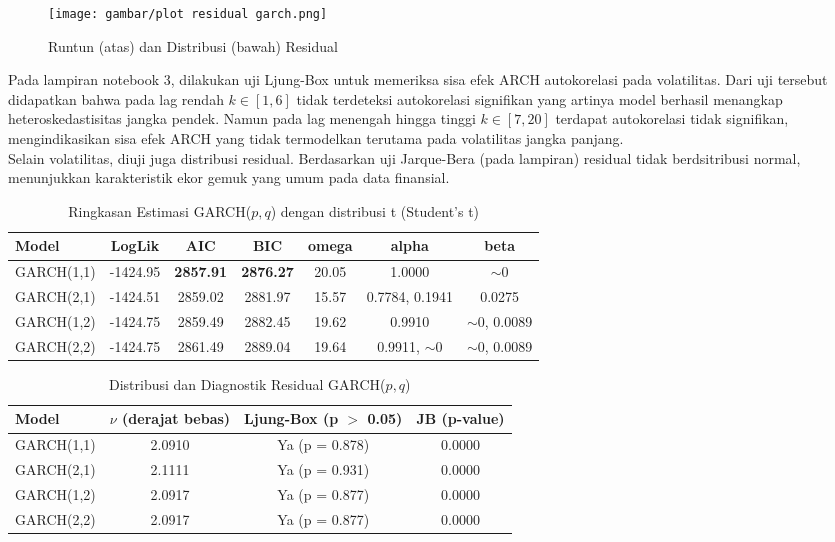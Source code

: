 \documentclass[a4paper,12pt]{article}
\begin{document}
\begin{figure}[htb!]
    \centering
    \texttt{[image: gambar/plot residual garch.png]}
    \caption{Runtun (atas) dan Distribusi (bawah) Residual}
    \label{fig:garchResid plot}
\end{figure}
Pada lampiran notebook 3, dilakukan uji Ljung-Box untuk memeriksa sisa efek ARCH autokorelasi pada volatilitas. Dari uji tersebut didapatkan bahwa pada lag rendah $k \in [1,6]$ tidak terdeteksi autokorelasi signifikan yang artinya model berhasil menangkap heteroskedastisitas jangka pendek. Namun pada lag menengah hingga tinggi $k \in [7, 20]$ terdapat autokorelasi tidak signifikan, mengindikasikan sisa efek ARCH yang tidak termodelkan terutama pada volatilitas jangka panjang. \\

Selain volatilitas, diuji juga distribusi residual. Berdasarkan uji Jarque-Bera (pada lampiran) residual tidak berdsitribusi normal, menunjukkan karakteristik ekor gemuk yang umum pada data finansial.

\begin{table}[h!]
\centering
\begin{tabular}{lcccccc}
\toprule
\textbf{Model} & \textbf{LogLik} & \textbf{AIC} & \textbf{BIC} & \textbf{omega} & \textbf{alpha} & \textbf{beta} \\
\midrule
GARCH(1,1) & -1424.95 & \textbf{2857.91} & \textbf{2876.27} & 20.05 & 1.0000 & $\sim 0$ \\
GARCH(2,1) & -1424.51 & 2859.02 & 2881.97 & 15.57 & 0.7784, 0.1941 & 0.0275 \\
GARCH(1,2) & -1424.75 & 2859.49 & 2882.45 & 19.62 & 0.9910 & $\sim 0$, 0.0089 \\
GARCH(2,2) & -1424.75 & 2861.49 & 2889.04 & 19.64 & 0.9911, $\sim 0$ & $\sim 0$, 0.0089 \\
\bottomrule
\end{tabular}
\caption{Ringkasan Estimasi GARCH($p,q$) dengan distribusi t (Student’s t)}
\end{table}

\vspace{0.5cm}

\begin{table}[h!]
\centering
\begin{tabular}{lccc}
\toprule
\textbf{Model} & \textbf{$\nu$ (derajat bebas)} & \textbf{Ljung-Box (p $>$ 0.05)} & \textbf{JB (p-value)} \\
\midrule
GARCH(1,1) & 2.0910 & Ya (p = 0.878) & 0.0000 \\
GARCH(2,1) & 2.1111 & Ya (p = 0.931) & 0.0000 \\
GARCH(1,2) & 2.0917 & Ya (p = 0.877) & 0.0000 \\
GARCH(2,2) & 2.0917 & Ya (p = 0.877) & 0.0000 \\
\bottomrule
\end{tabular}
\caption{Distribusi dan Diagnostik Residual GARCH($p,q$)}
\end{table}
\end{document}
